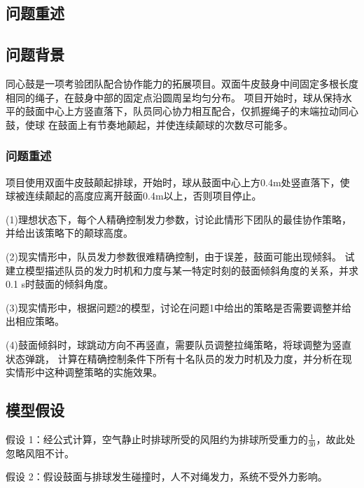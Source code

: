 \documentclass[UTF8]{article}
\begin{document}
\newpage
\begin{center}
    \section{问题重述}
\end{center}
\subsection{问题背景}
\thispagestyle{plain}
同心鼓是一项考验团队配合协作能力的拓展项目。双面牛皮鼓身中间固定多根长度相同的绳子，在鼓身中部的固定点沿圆周呈均匀分布。
项目开始时，球从保持水平的鼓面中心上方竖直落下，队员同心协力相互配合，仅抓握绳子的末端拉动同心鼓，使球
在鼓面上有节奏地颠起，并使连续颠球的次数尽可能多。
\subsubsection{问题重述}
项目使用双面牛皮鼓颠起排球，开始时，球从鼓面中心上方0.4m处竖直落下，使球被连续颠起的高度应离开鼓面0.4m以上，否则项目停止。
\par\setlength\parindent{2em}
(1)理想状态下，每个人精确控制发力参数，讨论此情形下团队的最佳协作策略，并给出该策略下的颠球高度。
\par\setlength\parindent{2em}(2)现实情形中，队员发力参数很难精确控制，由于误差，鼓面可能出现倾斜。
试建立模型描述队员的发力时机和力度与某一特定时刻的鼓面倾斜角度的关系，并求0.1 s时鼓面的倾斜角度。 
\par\setlength\parindent{2em}(3)现实情形中，根据问题2的模型，讨论在问题1中给出的策略是否需要调整并给出相应策略。
\par\setlength\parindent{2em}(4)鼓面倾斜时，球跳动方向不再竖直，需要队员调整拉绳策略，将球调整为竖直状态弹跳，
计算在精确控制条件下所有十名队员的发力时机及力度，并分析在现实情形中这种调整策略的实施效果。\\ 

\begin{center}
     \section{模型假设}  
\end{center} 

\par\setlength\parindent{2em}
假设 1：经公式计算，空气静止时排球所受的风阻约为排球所受重力的$\frac{1}{30}$，故此处忽略风阻不计。 

假设 2：假设鼓面与排球发生碰撞时，人不对绳发力，系统不受外力影响。
\end{document}
